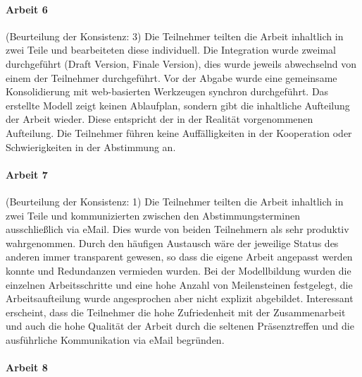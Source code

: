 
\paragraph{Arbeit 6} %
\label{par:arbeit_6}

(Beurteilung der Konsistenz: 3) Die Teilnehmer teilten die Arbeit inhaltlich in zwei Teile und bearbeiteten diese individuell. Die Integration wurde zweimal durchgeführt (Draft Version, Finale Version), dies wurde jeweils abwechselnd von einem der Teilnehmer durchgeführt. Vor der Abgabe wurde eine gemeinsame Konsolidierung mit web-basierten Werkzeugen synchron durchgeführt. Das erstellte Modell zeigt keinen Ablaufplan, sondern gibt die inhaltliche Aufteilung der Arbeit wieder. Diese entspricht der in der Realität vorgenommenen Aufteilung. Die Teilnehmer führen keine Auffälligkeiten in der Kooperation oder Schwierigkeiten in der Abstimmung an.


\paragraph{Arbeit 7} %
\label{par:arbeit_7}

(Beurteilung der Konsistenz: 1) Die Teilnehmer teilten die Arbeit inhaltlich in zwei Teile und kommunizierten zwischen den Abstimmungsterminen ausschließlich via eMail. Dies wurde von beiden Teilnehmern als sehr produktiv wahrgenommen. Durch den häufigen Austausch wäre der jeweilige Status des anderen immer transparent gewesen, so dass die eigene Arbeit angepasst werden konnte und Redundanzen vermieden wurden. Bei der Modellbildung wurden die einzelnen Arbeitsschritte und eine hohe Anzahl von Meilensteinen festgelegt, die Arbeitsaufteilung wurde angesprochen aber nicht explizit abgebildet. Interessant erscheint, dass die Teilnehmer die hohe Zufriedenheit mit der Zusammenarbeit und auch die hohe Qualität der Arbeit durch die seltenen Präsenztreffen und die ausführliche Kommunikation via eMail begründen.


\paragraph{Arbeit 8} %
\label{par:arbeit_8}

